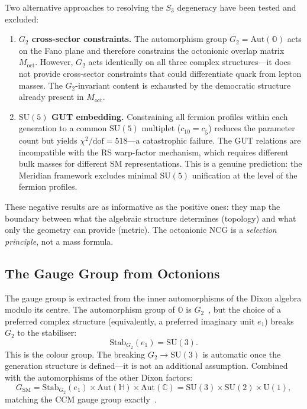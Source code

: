 \begin{remark}
\label{rem:4-negative-results}
Two alternative approaches to resolving the $S_3$ degeneracy have been tested and excluded:
\begin{enumerate}
\item \textbf{$G_2$ cross-sector constraints.} The automorphism group $G_2 = \mathrm{Aut}(\mathbb{O})$ acts on the Fano plane and therefore constrains the octonionic overlap matrix $M_\mathrm{oct}$. However, $G_2$ acts identically on all three complex structures---it does not provide cross-sector constraints that could differentiate quark from lepton masses. The $G_2$-invariant content is exhausted by the democratic structure already present in $M_\mathrm{oct}$.
\item \textbf{$\mathrm{SU}(5)$ GUT embedding.} Constraining all fermion profiles within each generation to a common $\mathrm{SU}(5)$ multiplet ($c_{10} = c_{\bar{5}}$) reduces the parameter count but yields $\chi^2/\mathrm{dof} = 518$---a catastrophic failure. The GUT relations are incompatible with the RS warp-factor mechanism, which requires different bulk masses for different SM representations. This is a genuine prediction: the Meridian framework excludes minimal $\mathrm{SU}(5)$ unification at the level of the fermion profiles.
\end{enumerate}
These negative results are as informative as the positive ones: they map the boundary between what the algebraic structure determines (topology) and what only the geometry can provide (metric). The octonionic NCG is a \emph{selection principle}, not a mass formula.
\end{remark}


\subsection{The Gauge Group from Octonions}
\label{sec:4-gauge-oct}

The gauge group is extracted from the inner automorphisms of the Dixon algebra modulo its centre. The automorphism group of $\mathbb{O}$ is $G_2$~\cite{ch4:Baez2002}, but the choice of a preferred complex structure (equivalently, a preferred imaginary unit $e_1$) breaks $G_2$ to the stabiliser:
\begin{equation}
  \mathrm{Stab}_{G_2}(e_1) = \mathrm{SU}(3).
  \label{eq:4-91}
\end{equation}
This is the colour group. The breaking $G_2 \to \mathrm{SU}(3)$ is automatic once the generation structure is defined---it is not an additional assumption. Combined with the automorphisms of the other Dixon factors:
\begin{equation}
  G_{\mathrm{SM}} = \mathrm{Stab}_{G_2}(e_1) \times \mathrm{Aut}(\mathbb{H}) \times \mathrm{Aut}(\mathbb{C}) = \mathrm{SU}(3) \times \mathrm{SU}(2) \times \mathrm{U}(1),
  \label{eq:4-92}
\end{equation}
matching the CCM gauge group exactly~\cite{ch4:Krasnov2025,ch4:Furey2025}.

